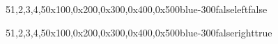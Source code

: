 \documentclass{article}
\begin{document}
%

\begin{stack}
    {5}{1,2,3,4,5}{0x100,0x200,0x300,0x400,0x500}{blue-300}{false}{left}{false}
\end{stack}

\vspace{20mm}

\begin{stack}
    {5}{1,2,3,4,5}{0x100,0x200,0x300,0x400,0x500}{blue-300}{false}{right}{true}
\end{stack}
\end{document}
